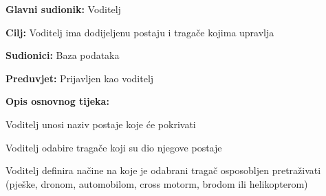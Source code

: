 					
					\noindent {}
					\begin{packed_item}
						
						\item \textbf{Glavni sudionik: }Voditelj
						\item  \textbf{Cilj:} Voditelj ima dodijeljenu postaju i tragače kojima upravlja
						\item  \textbf{Sudionici:} Baza podataka
						\item  \textbf{Preduvjet:} Prijavljen kao voditelj
						\item  \textbf{Opis osnovnog tijeka:}
						
						\item[] \begin{packed_enum}
							
							\item Voditelj unosi naziv postaje koje će pokrivati
							\item Voditelj odabire tragače koji su dio njegove postaje
							\item Voditelj definira načine na koje je odabrani tragač osposobljen pretraživati (pješke, dronom, automobilom, cross motorm, brodom ili helikopterom)
							
							
							\end{packed_enum}
						
						
					\end{packed_item}
					
